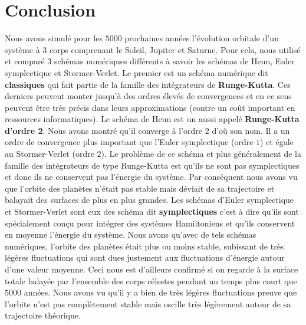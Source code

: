 \documentclass[11pt,twoside=semi,openright,numbers=noenddot]{article}
\begin{document}
\section{Conclusion}
Nous avons simulé pour les $5000$ prochaines années l'évolution orbitale d'un système à $3$ corps comprenant le Soleil, Jupiter et Saturne. Pour cela, nous utilisé et comparé $3$ schémas numériques différents à savoir les schémas de Heun, Euler symplectique et Stormer-Verlet. Le premier est un schéma numérique dit \textbf{classiques} qui fait partie de la famille des intégrateurs de \textbf{Runge-Kutta}. Ces derniers peuvent monter jusqu'à des ordres élevés de convergences et en ce sens peuvent être très précis dans leurs approximations (contre un coût important en ressources informatiques). Le schéma de Heun est un aussi appelé \textbf{Runge-Kutta d'ordre 2}. Nous avons montré qu'il converge à l'ordre $2$ d'où son nom. Il a un ordre de convergence plus important que l'Euler symplectique (ordre $1$) et égale au Stormer-Verlet (ordre $2$). Le problème de ce schéma et plus généralement de la famille des intégrateurs de type Runge-Kutta est qu'ils ne sont pas symplectiques et donc ils ne conservent pas l'énergie du système. Par conséquent nous avons vu que l'orbite des planètes n'était pas stable mais déviait de sa trajectoire et balayait des surfaces de plus en plus grandes. Les schémas d'Euler symplectique et Stormer-Verlet sont eux des schéma dit \textbf{symplectiques} c'est à dire qu'ils sont spécialement conçu pour intégrer des systèmes Hamiltoniens et qu'ils conservent en moyenne l'énergie du système. Nous avons qu'avec de tels schémas numériques, l'orbite des planètes était plus ou moins stable, subissant de très légères fluctuations qui sont dues justement aux fluctuations d'énergie autour d'une valeur moyenne. Ceci nous est d'ailleurs confirmé si on regarde à la surface totale balayée par l'ensemble des corps célestes pendant un temps plus court que $5000$ années. Nous avons vu qu'il y a bien de très légères fluctuations preuve que l'orbite n'est pas complètement stable mais oscille très légèrement autour de sa trajectoire théorique.

\newpage
\appendix
\appendixpage
\addappheadtotoc
\end{document}
